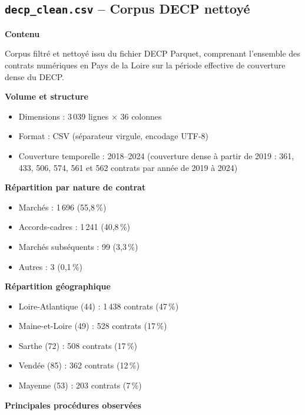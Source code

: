 \documentclass[12pt,a4paper]{article}
\begin{document}
\subsection{\texttt{decp\_clean.csv} -- Corpus DECP nettoyé}

\textbf{Contenu}

Corpus filtré et nettoyé issu du fichier DECP Parquet, comprenant l'ensemble
des contrats numériques en Pays de la Loire sur la période effective de
couverture dense du DECP.

\medskip
\textbf{Volume et structure}

\begin{itemize}
  \item[---] Dimensions : 3\,039 lignes × 36 colonnes
  \item[---] Format : CSV (séparateur virgule, encodage UTF-8)
  \item[---] Couverture temporelle : 2018--2024 (couverture dense à partir de
    2019 : 361, 433, 506, 574, 561 et 562 contrats par année de 2019 à 2024)
\end{itemize}

\medskip
\textbf{Répartition par nature de contrat}

\begin{itemize}
  \item[---] Marchés : 1\,696 (55,8\,\%)
  \item[---] Accords-cadres : 1\,241 (40,8\,\%)
  \item[---] Marchés subséquents : 99 (3,3\,\%)
  \item[---] Autres : 3 (0,1\,\%)
\end{itemize}

\medskip
\textbf{Répartition géographique}

\begin{itemize}
  \item[---] Loire-Atlantique (44) : 1\,438 contrats (47\,\%)
  \item[---] Maine-et-Loire (49) : 528 contrats (17\,\%)
  \item[---] Sarthe (72) : 508 contrats (17\,\%)
  \item[---] Vendée (85) : 362 contrats (12\,\%)
  \item[---] Mayenne (53) : 203 contrats (7\,\%)
\end{itemize}

\medskip
\textbf{Principales procédures observées}
\end{document}
